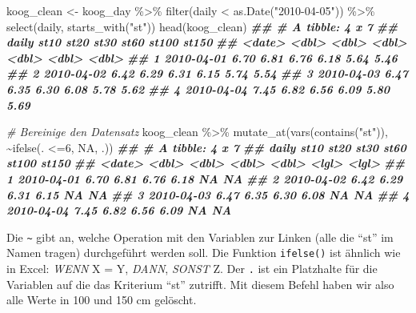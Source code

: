 \documentclass[
]{article}
\newenvironment{Shaded}{\begin{snugshade}}{\end{snugshade}}
\newcommand{\CommentTok}[1]{\textcolor[rgb]{0.56,0.35,0.01}{\textit{#1}}}
\newcommand{\ConstantTok}[1]{\textcolor[rgb]{0.00,0.00,0.00}{#1}}
\newcommand{\DecValTok}[1]{\textcolor[rgb]{0.00,0.00,0.81}{#1}}
\newcommand{\DocumentationTok}[1]{\textcolor[rgb]{0.56,0.35,0.01}{\textbf{\textit{#1}}}}
\newcommand{\FunctionTok}[1]{\textcolor[rgb]{0.00,0.00,0.00}{#1}}
\newcommand{\NormalTok}[1]{#1}
\newcommand{\OtherTok}[1]{\textcolor[rgb]{0.56,0.35,0.01}{#1}}
\newcommand{\SpecialCharTok}[1]{\textcolor[rgb]{0.00,0.00,0.00}{#1}}
\newcommand{\StringTok}[1]{\textcolor[rgb]{0.31,0.60,0.02}{#1}}
\begin{document}
\begin{Shaded}
\begin{Highlighting}[]
\NormalTok{koog\_clean }\OtherTok{\textless{}{-}}\NormalTok{ koog\_day }\SpecialCharTok{\%\textgreater{}\%}
  \FunctionTok{filter}\NormalTok{(daily }\SpecialCharTok{\textless{}} \FunctionTok{as.Date}\NormalTok{(}\StringTok{"2010{-}04{-}05"}\NormalTok{)) }\SpecialCharTok{\%\textgreater{}\%}
  \FunctionTok{select}\NormalTok{(daily, }\FunctionTok{starts\_with}\NormalTok{(}\StringTok{"st"}\NormalTok{))}
\FunctionTok{head}\NormalTok{(koog\_clean)}
\DocumentationTok{\#\# \# A tibble: 4 x 7}
\DocumentationTok{\#\#   daily       st10  st20  st30  st60 st100 st150}
\DocumentationTok{\#\#   \textless{}date\textgreater{}     \textless{}dbl\textgreater{} \textless{}dbl\textgreater{} \textless{}dbl\textgreater{} \textless{}dbl\textgreater{} \textless{}dbl\textgreater{} \textless{}dbl\textgreater{}}
\DocumentationTok{\#\# 1 2010{-}04{-}01  6.70  6.81  6.76  6.18  5.64  5.46}
\DocumentationTok{\#\# 2 2010{-}04{-}02  6.42  6.29  6.31  6.15  5.74  5.54}
\DocumentationTok{\#\# 3 2010{-}04{-}03  6.47  6.35  6.30  6.08  5.78  5.62}
\DocumentationTok{\#\# 4 2010{-}04{-}04  7.45  6.82  6.56  6.09  5.80  5.69}

\CommentTok{\# Bereinige den Datensatz}
\NormalTok{koog\_clean }\SpecialCharTok{\%\textgreater{}\%} 
  \FunctionTok{mutate\_at}\NormalTok{(}\FunctionTok{vars}\NormalTok{(}\FunctionTok{contains}\NormalTok{(}\StringTok{"st"}\NormalTok{)), }\SpecialCharTok{\textasciitilde{}}\FunctionTok{ifelse}\NormalTok{(. }\SpecialCharTok{\textless{}=}\DecValTok{6}\NormalTok{, }\ConstantTok{NA}\NormalTok{, .))}
\DocumentationTok{\#\# \# A tibble: 4 x 7}
\DocumentationTok{\#\#   daily       st10  st20  st30  st60 st100 st150}
\DocumentationTok{\#\#   \textless{}date\textgreater{}     \textless{}dbl\textgreater{} \textless{}dbl\textgreater{} \textless{}dbl\textgreater{} \textless{}dbl\textgreater{} \textless{}lgl\textgreater{} \textless{}lgl\textgreater{}}
\DocumentationTok{\#\# 1 2010{-}04{-}01  6.70  6.81  6.76  6.18 NA    NA   }
\DocumentationTok{\#\# 2 2010{-}04{-}02  6.42  6.29  6.31  6.15 NA    NA   }
\DocumentationTok{\#\# 3 2010{-}04{-}03  6.47  6.35  6.30  6.08 NA    NA   }
\DocumentationTok{\#\# 4 2010{-}04{-}04  7.45  6.82  6.56  6.09 NA    NA}
\end{Highlighting}
\end{Shaded}

Die \texttt{\textasciitilde{}} gibt an, welche Operation mit den Variablen zur Linken (alle die ``st'' im Namen tragen) durchgeführt werden soll. Die Funktion \texttt{ifelse()} ist ähnlich wie in Excel: \emph{WENN} X = Y, \emph{DANN}, \emph{SONST} Z. Der \texttt{.} ist ein Platzhalte für die Variablen auf die das Kriterium ``st'' zutrifft. Mit diesem Befehl haben wir also alle Werte in 100 und 150 cm gelöscht.
\end{document}
